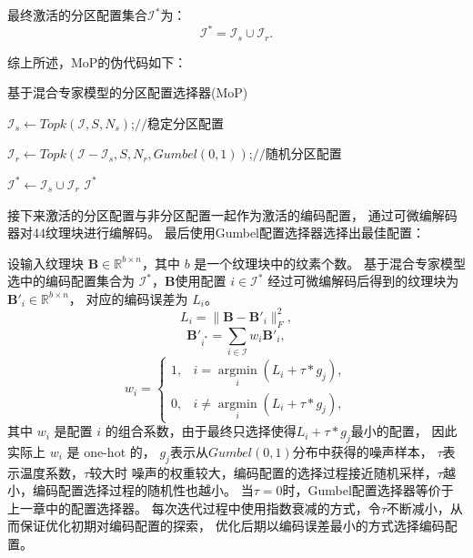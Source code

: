 最终激活的分区配置集合$\mathcal{I}^*$为：
\begin{equation}
\mathcal{I}^*=\mathcal{I}_{s}\cup\mathcal{I}_r.
\end{equation}

综上所述，MoP的伪代码如下：

\begin{algorithm}[htbp]
    \caption{基于混合专家模型的分区配置选择器(MoP)}
    $\mathcal{I}_s \gets \mathit{Topk}(\mathcal{I},S,N_s)$;\hfill $//$稳定分区配置

    $\mathcal{I}_r \gets \mathit{Topk}(\mathcal{I}-\mathcal{I}_s,S,N_r,Gumbel(0, 1))$;\hfill $//$随机分区配置
    
    $\mathcal{I}^* \gets \mathcal{I}_{s}\cup\mathcal{I}_r$\;
    \Return $\mathcal{I}^*$
\end{algorithm}

接下来激活的分区配置与非分区配置一起作为激活的编码配置，
通过可微编解码器对4\times4纹理块进行编解码。
最后使用Gumbel配置选择器选择出最佳配置：

设输入纹理块 $\mathbf{B}\in\mathbb{R}^{b\times n}$，其中 $b$ 是一个纹理块中的纹素个数。
基于混合专家模型选中的编码配置集合为 $\mathcal{I}^*$，$\mathbf{B}$使用配置 $i\in\mathcal{I}^*$ 
经过可微编解码后得到的纹理块为 $\mathbf{B}'_i\in\mathbb{R}^{b\times n}$，
对应的编码误差为 $L_i$。
\begin{equation}
L_i=\|\mathbf{B}-\mathbf{B}'_i\|_F^2,
\end{equation}
\begin{equation}
\mathbf{B}'_{i^*}=\sum_{i\in\mathcal{I}} w_i\mathbf{B}'_i,
\end{equation}
\begin{equation}
    w_i =\left\{\begin{matrix}
        1,& i=\mathop{\arg\min}\limits_{i} (L_i+\tau*g_j),
        \\0,& i\ne\mathop{\arg\min}\limits_{i} (L_i+\tau*g_j),
        \end{matrix}\right.
\end{equation}
其中 $w_i$ 是配置 $i$ 的组合系数，由于最终只选择使得$L_i+\tau*g_j$最小的配置，
因此实际上 $w_i$ 是 one-hot 的，
$g_j$表示从$Gumbel(0,1)$分布中获得的噪声样本，
$\tau$表示温度系数，$\tau$较大时
噪声的权重较大，编码配置的选择过程接近随机采样，$\tau$越小，编码配置选择过程的随机性也越小。
当$\tau=0$时，Gumbel配置选择器等价于上一章中的配置选择器。
每次迭代过程中使用指数衰减的方式，令$\tau$不断减小，从而保证优化初期对编码配置的探索，
优化后期以编码误差最小的方式选择编码配置。

